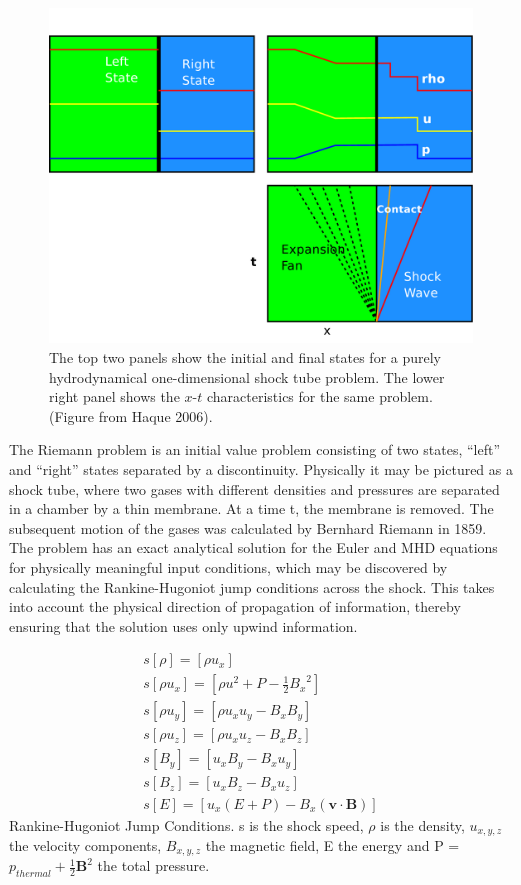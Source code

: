 \begin{figure}[t]
\centering
\includegraphics[width=\textwidth]{RiemannProblem}
\caption{
The top two panels show the initial and final states for a purely hydrodynamical one-dimensional shock tube problem. 
The lower right panel shows the $x$-$t$ characteristics for the same problem. 
(Figure from Haque 2006).
}
\label{fig:RiemannProblem} %
\end{figure}

The Riemann problem is an initial value problem consisting of two states, ``left'' and ``right''
states separated by a discontinuity. Physically it may be pictured as a shock
tube, where two gases with different densities and pressures are separated in a
chamber by a thin membrane. At a time t, the membrane is removed. The subsequent
motion of the gases was calculated by Bernhard Riemann in 1859. The problem has
an exact analytical solution for the Euler and MHD equations for physically
meaningful input conditions, which may be discovered by calculating the
Rankine-Hugoniot jump conditions across the shock. This takes into account the
physical direction of propagation of information, thereby ensuring that the
solution uses only upwind information.

\begin{equation}
\begin{array}{c}
s [\rho]= [\rho u_x] \\
s [\rho u_x]= [\rho u^2 + P  -\frac{1}{2}{B_x}^2] \\
s [\rho u_y]= [ \rho u_x u_y - B_x B_y] \\
s [\rho u_z]= [\rho u_x u_z - B_x B_z] \\
s [B_y]= [u_x B_y - B_x u_y]\\
s [B_z]= [u_x B_z - B_x u_z]\\
s [E] = [ u_x \left( E + P\right) -B_x\left( \mathbf{v \cdot B} \right)]
\end{array}
\end{equation}
Rankine-Hugoniot Jump Conditions. s is the shock speed, $\rho$ is the density, $u_{x,y,z}$ the velocity components, $B_{x,y,z}$ the magnetic field, E the energy and P = $p_{thermal} + \frac{1}{2}\mathbf{B}^2 $ the total pressure.

